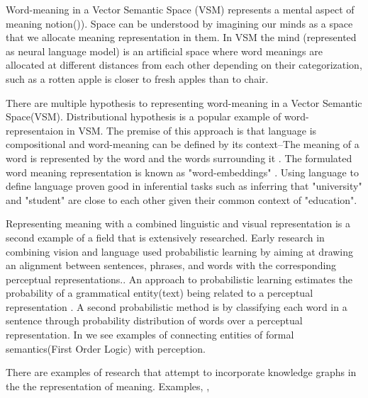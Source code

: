 \documentclass[11pt, a4paper]{article}
\begin{document}
Word-meaning in a Vector Semantic Space (VSM) represents a mental aspect of meaning notion(\cite{Turney_2010})). Space can be understood by imagining our minds as a space that we allocate meaning representation in them. In VSM the mind (represented as neural language model) is an artificial space where word meanings are allocated at different distances from each other depending on their categorization, such as a rotten apple is closer to fresh apples than to chair. 

There are multiple hypothesis to representing word-meaning in a Vector Semantic Space(VSM). Distributional hypothesis is a popular example of word-representaion in VSM. The premise of this approach is that language is compositional and word-meaning can be defined by its context--The meaning of a word is represented by the word and the words surrounding it \cite{Turney_2010}. The formulated word meaning representation is known as "word-embeddings" \cite{mikolov2013distributed}. Using language to define language proven good in inferential tasks such as inferring that "university" and "student" are close to each other given their common context of "education". 
 
 
Representing meaning with a combined linguistic and visual representation is a second example of a field that is extensively researched. Early research in combining vision and language used probabilistic learning by aiming at drawing an alignment between sentences, phrases, and words with the corresponding perceptual representations.\cite{790410}. An approach  to probabilistic learning estimates the probability of a grammatical entity(text) being related to a perceptual representation \cite{6751319}. A second probabilistic method is by classifying each word in a sentence through probability distribution of words over a perceptual representation. In \cite{matuszek2012joint} \cite{larsson2015formal} we see examples of connecting entities of formal semantics(First Order Logic) with perception. 

There are examples of research that attempt to incorporate knowledge graphs in the the representation of meaning. Examples, \cite{zhu2015building}, \cite{zhu2014reasoning}

\end{document}
